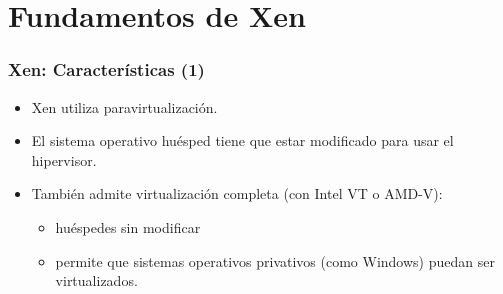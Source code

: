 \documentclass{beamer}
\begin{document}





\section{Fundamentos de Xen}


\begin{frame}
\frametitle{Xen: Características (1)}

\begin{itemize}
\item Xen utiliza \alert{paravirtualización}.
\item El sistema operativo huésped tiene que estar modificado para usar el hipervisor.
\item También admite virtualización completa (con Intel VT o AMD-V): 
	\begin{itemize}
	\item huéspedes sin modificar 
	\item permite que sistemas operativos privativos (como Windows) puedan ser virtualizados.
	\end{itemize}
\end{itemize}

\end{frame}

\end{document}
